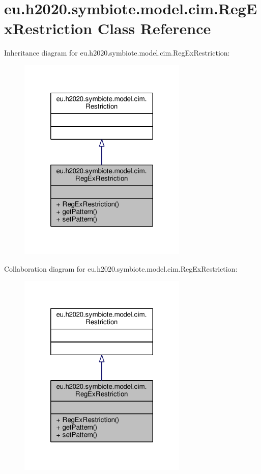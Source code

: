 \hypertarget{classeu_1_1h2020_1_1symbiote_1_1model_1_1cim_1_1RegExRestriction}{}\section{eu.\+h2020.\+symbiote.\+model.\+cim.\+Reg\+Ex\+Restriction Class Reference}
\label{classeu_1_1h2020_1_1symbiote_1_1model_1_1cim_1_1RegExRestriction}


Inheritance diagram for eu.\+h2020.\+symbiote.\+model.\+cim.\+Reg\+Ex\+Restriction\+:
\nopagebreak
\begin{figure}[H]
\begin{center}
\leavevmode
\includegraphics[width=228pt]{classeu_1_1h2020_1_1symbiote_1_1model_1_1cim_1_1RegExRestriction__inherit__graph}
\end{center}
\end{figure}


Collaboration diagram for eu.\+h2020.\+symbiote.\+model.\+cim.\+Reg\+Ex\+Restriction\+:
\nopagebreak
\begin{figure}[H]
\begin{center}
\leavevmode
\includegraphics[width=228pt]{classeu_1_1h2020_1_1symbiote_1_1model_1_1cim_1_1RegExRestriction__coll__graph}
\end{center}
\end{figure}
